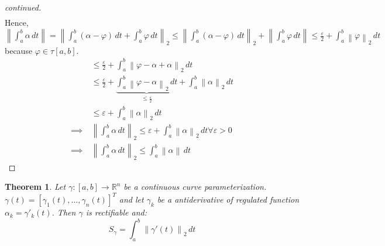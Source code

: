 \documentclass{article}
\newtheorem{theorem}{Theorem}  \numberwithin{theorem}{section}
\newcommand{\norm}[1]{\left\|#1\right\|}
\begin{document}
\begin{proof}[continued]
\begin{align*}
  \end{align*}
  Hence, $\norm{\int_a^b \alpha \, dt} = \norm{\int_a^b (\alpha - \varphi) \, dt + \int_a^b \varphi \, dt}_2 \leq \norm{\int_a^b (\alpha - \varphi) \, dt}_2 + \norm{\int_a^b \varphi \, dt} \leq \frac{\varepsilon}{2} + \int_a^b \norm{\varphi}_2 \, dt$ because $\varphi \in \tau[a,b]$.
  \begin{align*}
      &\leq \frac{\varepsilon}{2} + \int_a^b \norm{\varphi - \alpha + \alpha}_2 \, dt \\
      &\leq \frac{\varepsilon}{2} + \underbrace{\int_a^b \norm{\varphi - \alpha}_2 \, dt}_{\leq \frac\varepsilon2} + \int_a^b \norm{\alpha}_2 \, dt \\
      &\leq \varepsilon + \int_a^b \norm{\alpha}_2 \, dt \\
    \implies \: & \norm{\int_a^b \alpha \, dt}_2 \leq \varepsilon + \int_a^b \norm{\alpha}_2 \, dt \forall \varepsilon > 0 \\
    \implies \: & \norm{\int_a^b \alpha \, dt}_2 \leq \int_a^b \norm{\alpha} \, dt
  \end{align*}
\end{proof}

\begin{theorem} %
  Let $\gamma: [a,b] \to \mathbb R^n$ be a continuous curve parameterization.
  $\gamma(t) = [\gamma_1(t), \dots, \gamma_n(t)]^T$ and let $\gamma_k$ be a antiderivative of regulated function $\alpha_k = \gamma'_k(t)$.
  Then $\gamma$ is rectifiable and:
  \[ S_\gamma = \int_a^b \norm{\gamma'(t)}_2 \, dt \]
\end{theorem}
\end{document}
